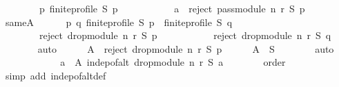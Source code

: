 \begin{isabellebody}
\ \ \ \ \ \ \ \ {\isacharparenleft}{\kern0pt}{\isasymforall}p{\isachardot}{\kern0pt}\ finite{\isacharunderscore}{\kern0pt}profile\ S\ p\ {\isasymlongrightarrow}\isanewline
\ \ \ \ \ \ \ \ \ \ a\ {\isasymin}\ reject\ {\isacharparenleft}{\kern0pt}pass{\isacharunderscore}{\kern0pt}module\ n\ r{\isacharparenright}{\kern0pt}\ S\ p{\isacharparenright}{\kern0pt}{\isacharparenright}{\kern0pt}{\isachardoublequoteclose}\isanewline
\ \ \isamarkupfalse%
\isanewline
\ \ \ \ \isamarkupfalse%
\ same{\isacharunderscore}{\kern0pt}A{\isacharcolon}{\kern0pt}\isanewline
\ \ \ \ \ \ {\isachardoublequoteopen}{\isasymforall}p\ q{\isachardot}{\kern0pt}\ {\isacharparenleft}{\kern0pt}finite{\isacharunderscore}{\kern0pt}profile\ S\ p\ {\isasymand}\ finite{\isacharunderscore}{\kern0pt}profile\ S\ q{\isacharparenright}{\kern0pt}\ {\isasymlongrightarrow}\isanewline
\ \ \ \ \ \ \ \ reject\ {\isacharparenleft}{\kern0pt}drop{\isacharunderscore}{\kern0pt}module\ n\ r{\isacharparenright}{\kern0pt}\ S\ p\ {\isacharequal}{\kern0pt}\isanewline
\ \ \ \ \ \ \ \ \ \ reject\ {\isacharparenleft}{\kern0pt}drop{\isacharunderscore}{\kern0pt}module\ n\ r{\isacharparenright}{\kern0pt}\ S\ q{\isachardoublequoteclose}\isanewline
\ \ \ \ \ \ \isamarkupfalse%
\ auto\isanewline
\ \ \ \ \isamarkupfalse%
\ {\isacharquery}{\kern0pt}A\ {\isacharequal}{\kern0pt}\ {\isachardoublequoteopen}reject\ {\isacharparenleft}{\kern0pt}drop{\isacharunderscore}{\kern0pt}module\ n\ r{\isacharparenright}{\kern0pt}\ S\ p{\isachardoublequoteclose}\isanewline
\ \ \ \ \isamarkupfalse%
\ {\isachardoublequoteopen}{\isacharquery}{\kern0pt}A\ {\isasymsubseteq}\ S{\isachardoublequoteclose}\isanewline
\ \ \ \ \ \ \isamarkupfalse%
\ auto\isanewline
\ \ \ \ \isamarkupfalse%
\ \isamarkupfalse%
\isanewline
\ \ \ \ \ \ {\isachardoublequoteopen}{\isacharparenleft}{\kern0pt}{\isasymforall}a\ {\isasymin}\ {\isacharquery}{\kern0pt}A{\isachardot}{\kern0pt}\ indep{\isacharunderscore}{\kern0pt}of{\isacharunderscore}{\kern0pt}alt\ {\isacharparenleft}{\kern0pt}drop{\isacharunderscore}{\kern0pt}module\ n\ r{\isacharparenright}{\kern0pt}\ S\ a{\isacharparenright}{\kern0pt}{\isachardoublequoteclose}\isanewline
\ \ \ \ \ \ \isamarkupfalse%
\ order\isanewline
\ \ \ \ \ \ \isamarkupfalse%
\ {\isacharparenleft}{\kern0pt}simp\ add{\isacharcolon}{\kern0pt}\ indep{\isacharunderscore}{\kern0pt}of{\isacharunderscore}{\kern0pt}alt{\isacharunderscore}{\kern0pt}def{\isacharparenright}{\kern0pt}\isanewline

\end{isabellebody}
